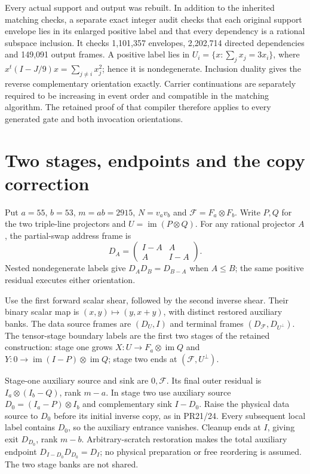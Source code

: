 \documentclass[11pt]{article}
\begin{document}
Every actual support and output was rebuilt. In addition to the inherited
matching checks, a separate exact integer audit checks that each original
support envelope lies in its enlarged positive label and that every
dependency is a rational subspace inclusion. It checks 1,101,357 envelopes,
2,202,714 directed dependencies and 149,091 output frames. A positive label
lies in $U_i=\{x:\sum_jx_j=3x_i\}$, where
$x^t(I-J/9)x=\sum_{j\ne i}x_j^2$; hence it is nondegenerate. Inclusion
duality gives the reverse complementary orientation exactly. Carrier
continuations are separately required to be increasing in event order and
compatible in the matching algorithm. The retained proof of that compiler
therefore applies to every generated gate and both invocation orientations.

\section{Two stages, endpoints and the copy correction}
Put $a=55$, $b=53$, $m=ab=2915$, $N=v_av_b$ and
$\mathcal F=F_a\otimes F_b$. Write $P,Q$ for the two triple-line
projectors and $U=\operatorname{im}(P\otimes Q)$. For any rational
projector $A$, the partial-swap address frame is
\[
 D_A=\begin{pmatrix}I-A&A\\A&I-A\end{pmatrix}.
\]
Nested nondegenerate labels give $D_AD_B=D_{B-A}$ when $A\le B$;
the same positive residual executes either orientation.

Use the first forward scalar shear, followed by the second inverse shear.
Their binary scalar map is $(x,y)\mapsto(y,x+y)$, with distinct restored
auxiliary banks. The data source frames are $(D_U,I)$ and terminal frames
$(D_{\mathcal F},D_{U^\perp})$. The tensor-stage boundary labels are
the first two stages of the retained construction: stage one grows
$X:U\to F_a\otimes\operatorname{im}Q$ and
$Y:0\to\operatorname{im}(I-P)\otimes\operatorname{im}Q$;
stage two ends at $(\mathcal F,U^\perp)$.

Stage-one auxiliary source and sink are $0,\mathcal F$. Its final
outer residual is $I_a\otimes(I_b-Q)$, rank $m-a$.
In stage two use auxiliary source
$D_0=(I_a-P)\otimes I_b$ and complementary sink $I-D_0$.
Raise the physical data source to $D_0$ before its initial inverse copy,
as in PR21/24. Every subsequent local label contains $D_0$, so the
auxiliary entrance vanishes. Cleanup ends at $I$, giving exit $D_{D_0}$,
rank $m-b$. Arbitrary-scratch restoration makes the total auxiliary
endpoint $D_{I-D_0}D_{D_0}=D_I$; no physical preparation or free
reordering is assumed. The two stage banks are not shared.
\end{document}
